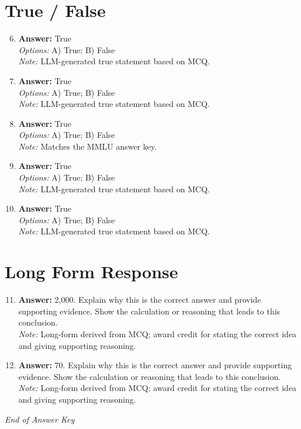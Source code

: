 \documentclass[12pt]{article}
\begin{document}
\section*{True / False}
\begin{enumerate}[label=\arabic*.]
\setcounter{enumi}{5}
\item \textbf{Answer:} True
\\ \textit{Options:} A) True; B) False
\\ \textit{Note:} LLM-generated true statement based on MCQ.
\item \textbf{Answer:} True
\\ \textit{Options:} A) True; B) False
\\ \textit{Note:} LLM-generated true statement based on MCQ.
\item \textbf{Answer:} True
\\ \textit{Options:} A) True; B) False
\\ \textit{Note:} Matches the MMLU answer key.
\item \textbf{Answer:} True
\\ \textit{Options:} A) True; B) False
\\ \textit{Note:} LLM-generated true statement based on MCQ.
\item \textbf{Answer:} True
\\ \textit{Options:} A) True; B) False
\\ \textit{Note:} LLM-generated true statement based on MCQ.
\end{enumerate}

\section*{Long Form Response}
\begin{enumerate}[label=\arabic*.]
\setcounter{enumi}{10}
\item \textbf{Answer:} 2,000. Explain why this is the correct answer and provide supporting evidence. Show the calculation or reasoning that leads to this conclusion.
\\ \textit{Note:} Long-form derived from MCQ; award credit for stating the correct idea and giving supporting reasoning.
\item \textbf{Answer:} 70. Explain why this is the correct answer and provide supporting evidence. Show the calculation or reasoning that leads to this conclusion.
\\ \textit{Note:} Long-form derived from MCQ; award credit for stating the correct idea and giving supporting reasoning.
\end{enumerate}

\vfill
\noindent\textit{End of Answer Key}
\end{document}
